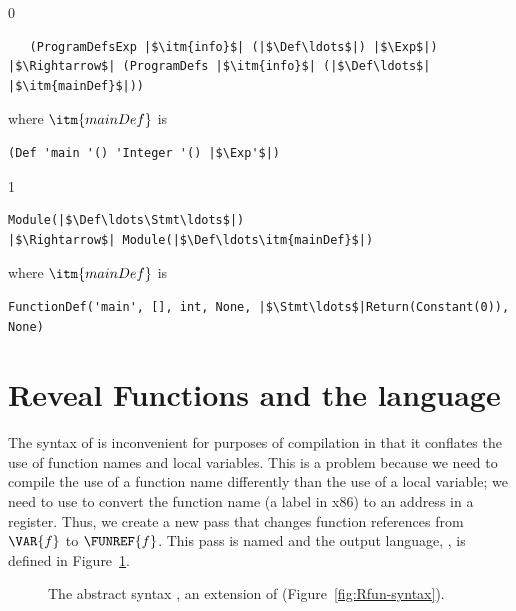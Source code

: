 \documentclass[7x10,nocrop]{TimesAPriori_MIT}%
\newcommand{\gray}[1]{{\color{gray} #1}}
\def\racketEd{0}
\def\pythonEd{1}
\def\edition{1}
\begin{document}
{\if\edition\racketEd  
\begin{lstlisting}
   (ProgramDefsExp |$\itm{info}$| (|$\Def\ldots$|) |$\Exp$|)
|$\Rightarrow$| (ProgramDefs |$\itm{info}$| (|$\Def\ldots$| |$\itm{mainDef}$|))
\end{lstlisting}
where $\itm{mainDef}$ is
\begin{lstlisting}
(Def 'main '() 'Integer '() |$\Exp'$|)
\end{lstlisting}
\fi}
{\if\edition\pythonEd
\begin{lstlisting}
Module(|$\Def\ldots\Stmt\ldots$|)
|$\Rightarrow$| Module(|$\Def\ldots\itm{mainDef}$|)
\end{lstlisting}
where $\itm{mainDef}$ is
\begin{lstlisting}
FunctionDef('main', [], int, None, |$\Stmt\ldots$|Return(Constant(0)), None)
\end{lstlisting}
\fi}

\section{Reveal Functions and the \LangFunRef{} language}
\label{sec:reveal-functions-r4}

The syntax of \LangFun{} is inconvenient for purposes of compilation
in that it conflates the use of function names and local
variables. This is a problem because we need to compile the use of a
function name differently than the use of a local variable; we need to
use  to convert the function name (a label in x86) to an
address in a register.  Thus, we create a new pass that changes
function references from $\VAR{f}$ to $\FUNREF{f}$. This pass is named
 and the output language, \LangFunRef{}, is
defined in Figure~\ref{fig:f1-syntax}.

\begin{figure}[tp]
\centering
\fbox{
\begin{minipage}{0.96\textwidth}
{\if\edition\racketEd   
\[
\begin{array}{lcl}
\Exp &::=& \ldots \MID \FUNREF{\Var}\\
 \Def &::=& \gray{ \FUNDEF{\Var}{([\Var \code{:} \Type]\ldots)}{\Type}{\code{'()}}{\Exp} }\\
  \LangFunRefM{} &::=& \PROGRAMDEFS{\code{'()}}{\LP \Def\ldots \RP}
\end{array}
\]
\fi}
{\if\edition\pythonEd  
\[
\begin{array}{lcl}
\Exp &::=& \FUNREF{\Var}\\
  \LangFunRefM{} &::=& \PROGRAM{}{\LS \Def \code{,} \ldots \RS}
\end{array}
\]
\fi}
\end{minipage}
}
\caption{The abstract syntax \LangFunRef{}, an extension of \LangFun{}
  (Figure~\ref{fig:Rfun-syntax}).}
\label{fig:f1-syntax}
\end{figure}
\end{document}
